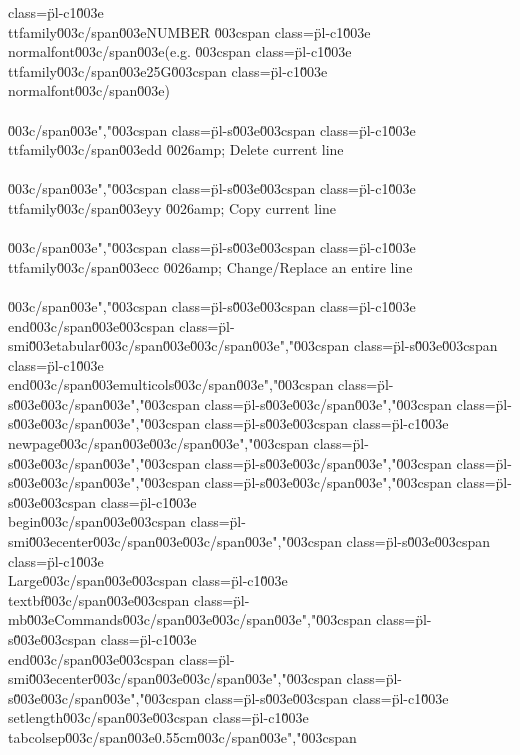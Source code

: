class=\"pl-c1\"\u003e\\ttfamily\u003c/span\u003e{NUMBER} \u003cspan class=\"pl-c1\"\u003e\\normalfont\u003c/span\u003e{(e.g. }\u003cspan class=\"pl-c1\"\u003e\\ttfamily\u003c/span\u003e{25G}\u003cspan class=\"pl-c1\"\u003e\\normalfont\u003c/span\u003e{)}\\\\\u003c/span\u003e","\u003cspan class=\"pl-s\"\u003e\u003cspan class=\"pl-c1\"\u003e\\ttfamily\u003c/span\u003e{dd} \u0026amp; Delete current line\\\\\u003c/span\u003e","\u003cspan class=\"pl-s\"\u003e\u003cspan class=\"pl-c1\"\u003e\\ttfamily\u003c/span\u003e{yy} \u0026amp; Copy current line\\\\\u003c/span\u003e","\u003cspan class=\"pl-s\"\u003e\u003cspan class=\"pl-c1\"\u003e\\ttfamily\u003c/span\u003e{cc} \u0026amp; Change/Replace an entire line\\\\\u003c/span\u003e","\u003cspan class=\"pl-s\"\u003e\u003cspan class=\"pl-c1\"\u003e\\end\u003c/span\u003e{\u003cspan class=\"pl-smi\"\u003etabular\u003c/span\u003e}\u003c/span\u003e","\u003cspan class=\"pl-s\"\u003e\u003cspan class=\"pl-c1\"\u003e\\end\u003c/span\u003e{multicols}\u003c/span\u003e","\u003cspan class=\"pl-s\"\u003e\u003c/span\u003e","\u003cspan class=\"pl-s\"\u003e\u003c/span\u003e","\u003cspan class=\"pl-s\"\u003e\u003c/span\u003e","\u003cspan class=\"pl-s\"\u003e\u003cspan class=\"pl-c1\"\u003e\\newpage\u003c/span\u003e\u003c/span\u003e","\u003cspan class=\"pl-s\"\u003e\u003c/span\u003e","\u003cspan class=\"pl-s\"\u003e\u003c/span\u003e","\u003cspan class=\"pl-s\"\u003e\u003c/span\u003e","\u003cspan class=\"pl-s\"\u003e\u003c/span\u003e","\u003cspan class=\"pl-s\"\u003e\u003cspan class=\"pl-c1\"\u003e\\begin\u003c/span\u003e{\u003cspan class=\"pl-smi\"\u003ecenter\u003c/span\u003e}\u003c/span\u003e","\u003cspan class=\"pl-s\"\u003e\u003cspan class=\"pl-c1\"\u003e\\Large\u003c/span\u003e\u003cspan class=\"pl-c1\"\u003e\\textbf\u003c/span\u003e{\u003cspan class=\"pl-mb\"\u003eCommands\u003c/span\u003e}\u003c/span\u003e","\u003cspan class=\"pl-s\"\u003e\u003cspan class=\"pl-c1\"\u003e\\end\u003c/span\u003e{\u003cspan class=\"pl-smi\"\u003ecenter\u003c/span\u003e}\u003c/span\u003e","\u003cspan class=\"pl-s\"\u003e\u003c/span\u003e","\u003cspan class=\"pl-s\"\u003e\u003cspan class=\"pl-c1\"\u003e\\setlength\u003c/span\u003e{\u003cspan class=\"pl-c1\"\u003e\\tabcolsep\u003c/span\u003e}{0.55cm}\u003c/span\u003e","\u003cspan 